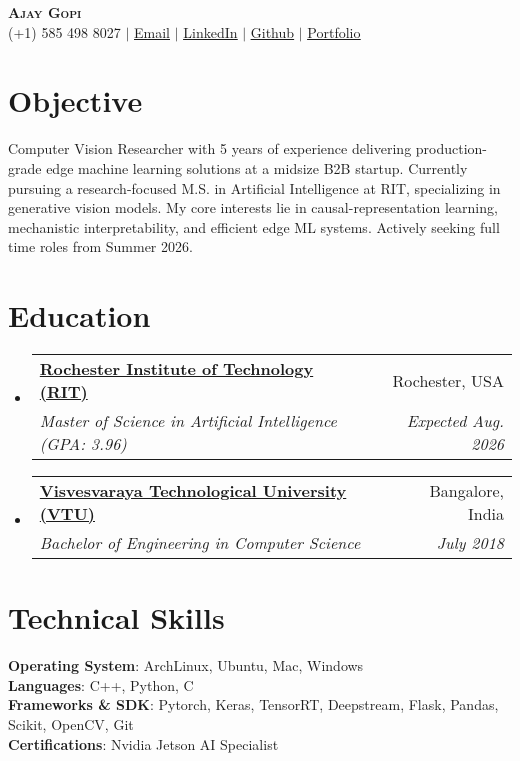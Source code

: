 \documentclass[letterpaper,10pt]{article}
\makeatletter
\newcommand{\resumeSubheading}[4]{
  \vspace{-2pt}\item
    \begin{tabular*}{0.97\textwidth}[t]{l@{\extracolsep{\fill}}r}
      \textbf{#1} & #2 \\
      \textit{\small#3} & \textit{\small #4} \\
    \end{tabular*}\vspace{-7pt}
}
\newcommand{\resumeSubHeadingListStart}{\begin{itemize}[leftmargin=0.15in, label={}]}
\newcommand{\resumeSubHeadingListEnd}{\end{itemize}}
\makeatother
\begin{document}
\begin{center}
    \textbf{\Huge \scshape Ajay Gopi} \\ \vspace{1pt}
    \small (+1) 585 498 8027 $|$ \href{mailto:ajaynaidu96@outlook.com}{\underline{Email}} $|$ 
    \href{https://www.linkedin.com/in/ajaynaidu96/}{\underline{LinkedIn}} $|$
    \href{https://github.com/ajay-naidu-96/}{\underline{Github}} $|$
    \href{https://ajay-naidu-96.github.io/}{\underline{Portfolio}}
\end{center}


\section{Objective}
Computer Vision Researcher with 5 years of experience delivering production-grade edge machine learning solutions at a
midsize B2B startup. Currently pursuing a research-focused M.S. in Artificial Intelligence at RIT, specializing in generative
vision models. My core interests lie in causal-representation learning, mechanistic interpretability, and efficient edge ML
systems. Actively seeking full time roles from Summer 2026.

\section{Education}
\resumeSubHeadingListStart
  \resumeSubheading
    {\href{https://www.rit.edu/}{Rochester Institute of Technology (RIT)}}
    {Rochester, USA}
    {Master of Science in Artificial Intelligence (GPA: 3.96)}
    {Expected Aug. 2026}
  \resumeSubheading
    {\href{https://vtu.ac.in/en/}{Visvesvaraya Technological University (VTU)}}
    {Bangalore, India}
    {Bachelor of Engineering in Computer Science}
    {July 2018}
\resumeSubHeadingListEnd

  \section{Technical Skills}
    \begin{itemize}[leftmargin=0.15in, label={}]
      \small{\item{
      \textbf{Operating System}{: ArchLinux, Ubuntu, Mac, Windows} \\
      \textbf{Languages}{: C++, Python, C} \\
      \textbf{Frameworks \& SDK}{: Pytorch, Keras, TensorRT, Deepstream, Flask, Pandas, Scikit, OpenCV, Git} \\
      \textbf{Certifications}{: Nvidia Jetson AI Specialist}
      }}
    \end{itemize}
\end{document}

